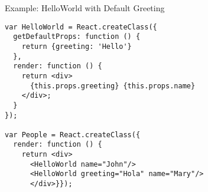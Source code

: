 \documentclass[presentation]{beamer}
\begin{document}
\begin{frame}[fragile,label=sec-20]{Example: HelloWorld with Default Greeting}
 \begin{verbatim}
var HelloWorld = React.createClass({
  getDefaultProps: function () {
    return {greeting: 'Hello'}
  },
  render: function () {
    return <div>
      {this.props.greeting} {this.props.name}
    </div>;
  }
});

var People = React.createClass({
  render: function () {
    return <div>
      <HelloWorld name="John"/>
      <HelloWorld greeting="Hola" name="Mary"/>
      </div>}});
\end{verbatim}
\end{frame}
\end{document}
